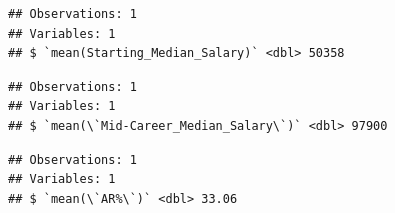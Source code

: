 \documentclass[]{article}
\newenvironment{Shaded}{\begin{snugshade}}{\end{snugshade}}
\newcommand{\KeywordTok}[1]{\textcolor[rgb]{0.13,0.29,0.53}{\textbf{#1}}}
\newcommand{\DataTypeTok}[1]{\textcolor[rgb]{0.13,0.29,0.53}{#1}}
\newcommand{\StringTok}[1]{\textcolor[rgb]{0.31,0.60,0.02}{#1}}
\newcommand{\OperatorTok}[1]{\textcolor[rgb]{0.81,0.36,0.00}{\textbf{#1}}}
\newcommand{\NormalTok}[1]{#1}
\begin{document}
\begin{Shaded}
\end{Shaded}

\begin{verbatim}
## Observations: 1
## Variables: 1
## $ `mean(Starting_Median_Salary)` <dbl> 50358
\end{verbatim}

\begin{Shaded}
\end{Shaded}

\begin{verbatim}
## Observations: 1
## Variables: 1
## $ `mean(\`Mid-Career_Median_Salary\`)` <dbl> 97900
\end{verbatim}

\begin{Shaded}
\end{Shaded}

\begin{verbatim}
## Observations: 1
## Variables: 1
## $ `mean(\`AR%\`)` <dbl> 33.06
\end{verbatim}

\begin{Shaded}
\end{Shaded}
\end{document}
